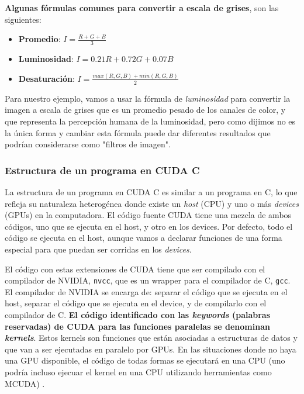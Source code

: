\begin{tcolorbox}[colback=mint,colframe=yellow!75!black,arc=0pt,outer arc=0pt]
  \textbf{Algunas fórmulas comunes para convertir a escala de grises}, son las siguientes: \\

  \begin{itemize}
    \item \textbf{Promedio}: $I = \frac{R + G + B}{3}$
    \item \textbf{Luminosidad}: $I = 0.21R + 0.72G + 0.07B$
    \item \textbf{Desaturación}: $I = \frac{max(R, G, B) + min(R, G, B)}{2}$
  \end{itemize}
\end{tcolorbox}

Para nuestro ejemplo, vamos a usar la fórmula de \textit{luminosidad} para convertir la imagen a escala de grises que es
un promedio pesado de los canales de color, y que representa la percepción humana de la luminosidad, pero como dijimos
no es la única forma y cambiar esta fórmula puede dar diferentes resultados que podrían considerarse como "filtros de
imagen".

\subsubsection{Estructura de un programa en CUDA C}

La estructura de un programa en CUDA C es similar a un programa en C, lo que refleja su naturaleza heterogénea donde
existe un \textit{host} (CPU) y uno o más \textit{devices} (GPUs) en la computadora. El código fuente CUDA tiene una
mezcla de ambos códigos, uno que se ejecuta en el host, y otro en los devices. Por defecto, todo el código se ejecuta en
el host, aunque vamos a declarar funciones de una forma especial para que puedan ser corridas en los \textit{devices}.

El código con estas extensiones de CUDA tiene que ser compilado con el compilador de NVIDIA, \texttt{nvcc}, que es un
wrapper para el compilador de C, \texttt{gcc}. El compilador de NVIDIA se encarga de: separar el código que se ejecuta en
el host, separar el código que se ejecuta en el device, y de compilarlo con el compilador de C. \textbf{El código
identificado con las \textit{keywords} (palabras reservadas) de CUDA para las funciones paralelas se denominan
\textit{kernels}}. Estos kernels son funciones que están asociadas a estructuras de datos y que van a ser ejecutadas en
paralelo por GPUs. En las situaciones donde no haya una GPU disponible, el código de todas formas se ejecutará en una
CPU (uno podría incluso ejecuar el kernel en una CPU utilizando herramientas como MCUDA) \cite{sutter2005}.

